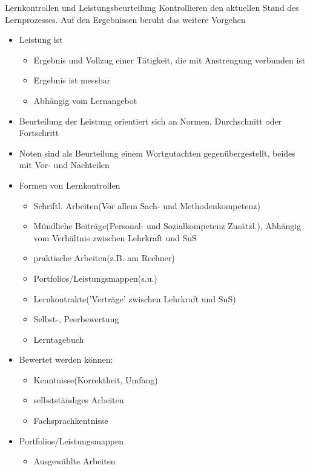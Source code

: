 \documentclass{article}
\begin{document}
\begin{block}{Lernkontrollen und Leistungsbeurteilung}
    Kontrollieren den aktuellen Stand des Lernprozesses. Auf den Ergebnissen  beruht das weitere Vorgehen
    \begin{itemize}
        \item Leistung ist
        \begin{itemize}
            \item Ergebnis und Vollzug einer Tätigkeit, die mit Anstrengung verbunden ist
            \item Ergebnis ist messbar
            \item Abhängig vom Lernangebot
        \end{itemize}
        \item Beurteilung der Leistung orientiert sich an Normen, Durchschnitt oder Fortschritt
        \item Noten sind als Beurteilung einem Wortgutachten gegenübergestellt, beides mit Vor- und Nachteilen
        \item Formen von Lernkontrollen
        \begin{itemize}
            \item Schriftl. Arbeiten(Vor allem Sach- und Methodenkompetenz)
            \item Mündliche Beiträge(Personal- und Sozialkompetenz Zusätzl.), Abhängig vom Verhältnis zwischen Lehrkraft und SuS
            \item praktische Arbeiten(z.B. am Rechner)
            \item Portfolios/Leistungsmappen(s.u.)
            \item Lernkontrakte('Verträge' zwischen Lehrkraft und SuS)
            \item Selbst-, Peerbewertung
            \item Lerntagebuch
        \end{itemize}
        \item Bewertet werden können:
        \begin{itemize}
            \item Kenntnisse(Korrektheit, Umfang)
            \item selbstständiges Arbeiten
            \item Fachsprachkentnisse
        \end{itemize}
        \item Portfolios/Leistungsmappen
        \begin{itemize}
            \item Ausgewählte Arbeiten

\end{itemize}
\end{itemize}
\end{block}
\end{document}
